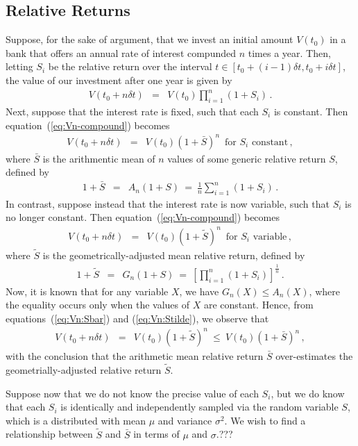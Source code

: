 \documentclass[a4paper]{article}
\begin{document}
\subsection{Relative Returns}
Suppose, for the sake of argument, that we invest an initial amount
$V(t_0)$ in a bank that offers an annual rate of interest compunded
$n$ times a year. Then, letting $S_i$ be the relative return
over the interval $t\in[t_0+(i-1)\delta t,t_0+i\delta t]$, the
value of our investment after one year is given by
\begin{eqnarray}
V(t_0+n\delta t) & = & V(t_0)\prod_{i=1}^{n}(1+S_i)\,.
\label{eq:Vn-compound}
\end{eqnarray}
Next, suppose that the interest rate is fixed, such that each 
$S_i$ is constant. Then equation~(\ref{eq:Vn-compound}) becomes
\begin{eqnarray}
V(t_0+n\delta t) & = & V(t_0)(1+\bar{S})^{n}
\,\,\,\mbox{for $S_i$ constant}\,,
\label{eq:Vn:Sbar}
\end{eqnarray}
where $\bar{S}$ is the arithmentic mean of
$n$ values of some generic relative return $S$, defined by
\begin{eqnarray}
1+\bar{S} & = & A_n(1+S)~=~\frac{1}{n}\sum_{i=1}^{n}(1+S_i)\,.
\end{eqnarray}
In contrast, suppose instead that the interest rate is now variable, 
such that $S_i$ is no longer constant.
Then equation~(\ref{eq:Vn-compound}) becomes
\begin{eqnarray}
V(t_0+n\delta t) & = & V(t_0)(1+\tilde{S})^{n}
\,\,\,\mbox{for $S_i$ variable}\,,
\label{eq:Vn:Stilde}
\end{eqnarray}
where $\tilde{S}$ is the geometrically-adjusted mean relative return,
defined by
\begin{eqnarray}
1+\tilde{S} & = & G_n(1+S)~=~
\left[\prod_{i=1}^{n}(1+S_i)\right]^{\frac{1}{n}}\,.
\label{eq:Gn:def}
\end{eqnarray}
Now, it is known that for any variable $X$, we have $G_n(X)\le A_n(X)$, where the
equality occurs only when the values of $X$ are constant.
Hence, from equations~(\ref{eq:Vn:Sbar}) and (\ref{eq:Vn:Stilde}),
we observe that
\begin{eqnarray}
V(t_0+n\delta t) & = & V(t_0)(1+\tilde{S})^{n}
~\le~V(t_0)(1+\bar{S})^{n}\,,
\end{eqnarray}
with the conclusion that the arithmetic mean relative return
$\bar{S}$ over-estimates the geometrially-adjusted relative return
$\tilde{S}$.

Suppose now that we do not know the precise value of each $S_i$, but
we do know that each $S_i$ is identically and independently sampled via
the random variable $S$, which is a  distributed with
mean $\mu$ and variance $\sigma^2$.
We wish to find a relationship between $\tilde{S}$ and $\bar{S}$
in terms of $\mu$ and $\sigma$.???
\end{document}
